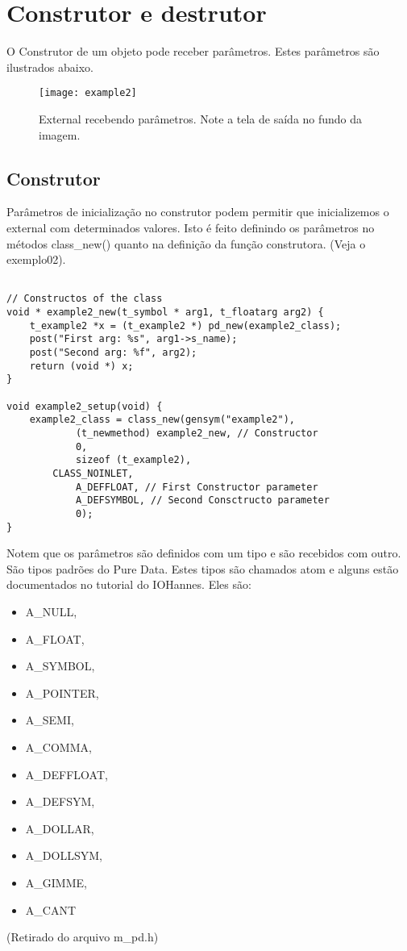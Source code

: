 
\chapter{Construtor e destrutor}

O Construtor de um objeto pode receber parâmetros. Estes parâmetros são
ilustrados abaixo.

\begin{figure}[h!]
	\centering
	\texttt{[image: example2]}
	\caption{External recebendo parâmetros. Note a tela de saída no fundo da imagem.}
\end{figure}

\section{Construtor}

Parâmetros de inicialização no construtor podem permitir que inicializemos o
external com determinados valores. Isto é feito definindo os parâmetros no
métodos class\_new() quanto na definição da função construtora. (Veja o
exemplo02).

\begin{lstlisting}

// Constructos of the class
void * example2_new(t_symbol * arg1, t_floatarg arg2) {
    t_example2 *x = (t_example2 *) pd_new(example2_class);
    post("First arg: %s", arg1->s_name);
    post("Second arg: %f", arg2);
    return (void *) x;
}

void example2_setup(void) {
    example2_class = class_new(gensym("example2"),
            (t_newmethod) example2_new, // Constructor
            0,
            sizeof (t_example2),
	    CLASS_NOINLET,
            A_DEFFLOAT, // First Constructor parameter
            A_DEFSYMBOL, // Second Consctructo parameter
            0);
}
\end{lstlisting}

Notem que os parâmetros são definidos com um tipo e são recebidos com outro.
São tipos padrões do Pure Data. Estes tipos são chamados atom e alguns estão
documentados no tutorial do IOHannes. Eles são:

\begin{itemize}
\item A\_NULL,
\item A\_FLOAT,
\item A\_SYMBOL,
\item A\_POINTER,
\item A\_SEMI,
\item A\_COMMA,
\item A\_DEFFLOAT,
\item A\_DEFSYM,
\item A\_DOLLAR, 
\item A\_DOLLSYM,
\item A\_GIMME,
\item A\_CANT
\end{itemize}
(Retirado do arquivo m\_pd.h)

